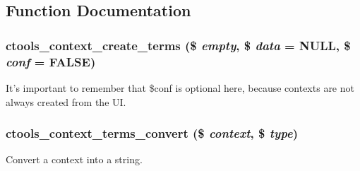 \subsection{Function Documentation}
\hypertarget{contexts_2terms_8inc_a0a71790a760636b43936682e9f310ae2}{
\subsubsection[{ctools\_\-context\_\-create\_\-terms}]{\setlength{\rightskip}{0pt plus 5cm}ctools\_\-context\_\-create\_\-terms (\$ {\em empty}, \/  \$ {\em data} = {\ttfamily NULL}, \/  \$ {\em conf} = {\ttfamily FALSE})}}
\label{contexts_2terms_8inc_a0a71790a760636b43936682e9f310ae2}
It's important to remember that \$conf is optional here, because contexts are not always created from the UI. \hypertarget{contexts_2terms_8inc_aa556c779179faa1c50963ec53ffc7320}{
\subsubsection[{ctools\_\-context\_\-terms\_\-convert}]{\setlength{\rightskip}{0pt plus 5cm}ctools\_\-context\_\-terms\_\-convert (\$ {\em context}, \/  \$ {\em type})}}
\label{contexts_2terms_8inc_aa556c779179faa1c50963ec53ffc7320}
Convert a context into a string. 

